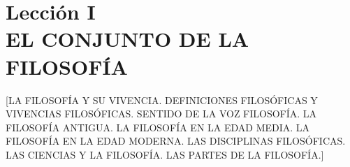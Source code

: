 \documentclass[10pt,letterpaper]{book}
\author{Manuel García Morente}
\begin{document}
\chapter*{Lecci\'{o}n I\\EL CONJUNTO DE LA FILOSOF\'{I}A}
[LA FILOSOFÍA Y SU VIVENCIA. DEFINICIONES FILOSÓFICAS Y VIVENCIAS FILOSÓFICAS. SENTIDO DE LA VOZ FILOSOFÍA. LA FILOSOFÍA ANTIGUA. LA FILOSOFÍA EN LA EDAD ME­DIA. LA FILOSOFÍA EN LA EDAD MODERNA. LAS DISCIPLI­NAS FILOSÓFICAS. LAS CIENCIAS Y LA FILOSOFÍA. LAS PAR­TES DE LA FILOSOFÍA.]
\end{document}
